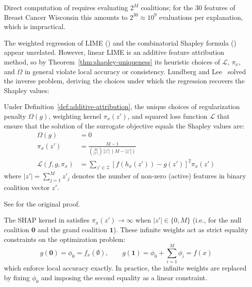     Direct computation of  requires evaluating $2^M$ coalitions; for the 30 features of Breast Cancer Wisconsin this amounts to $2^{30} \approx 10^9$ evaluations per explanation, which is impractical.

    The weighted regression of LIME () and the combinatorial Shapley formula () appear unrelated. However, linear LIME is an additive feature attribution method, so by Theorem~\ref{thm:shapley-uniqueness} its heuristic choices of $\mathcal{L}$, $\pi_x$, and $\Omega$ in general violate local accuracy or consistency. Lundberg and Lee~\cite{NIPS2017_8a20a862} solved the inverse problem, deriving the choices under which the regression recovers the Shapley values:

    \begin{theorem}
    \label{thm:shapley-kernel}
    Under Definition~\ref{def:additive-attribution}, the unique choices of regularization penalty $\Omega(g)$, weighting kernel $\pi_x(z')$, and squared loss function $\mathcal{L}$ that ensure that the solution of the surrogate objective equals the Shapley values are:
    \begin{align}
        \Omega(g) &= 0 \label{eq:kernelshap-reg} \\
        \pi_x(z') &= \frac{M - 1}{\binom{M}{|z'|} \, |z'| \, (M - |z'|)} \label{eq:shap-kernel} \\
        \mathcal{L}(f, g, \pi_x) &= \sum_{z' \in \mathcal{Z}} \left[ f(h_x(z')) - g(z') \right]^2 \pi_x(z') \label{eq:kernelshap-loss}
    \end{align}
    where $|z'| = \sum_{j=1}^M z'_j$ denotes the number of non-zero (active) features in binary coalition vector $z'$.
    \end{theorem}

    See  for the original proof.

    The SHAP kernel in  satisfies $\pi_x(z') \to \infty$ when $|z'| \in \{0, M\}$ (i.e., for the null coalition $\mathbf{0}$ and the grand coalition $\mathbf{1}$). These infinite weights act as strict equality constraints on the optimization problem:
    \begin{equation}
        g(\mathbf{0}) = \phi_0 = f_x(\emptyset), \qquad g(\mathbf{1}) = \phi_0 + \sum_{i=1}^M \phi_i = f(x)
    \end{equation}
    which enforce local accuracy exactly. In practice, the infinite weights are replaced by fixing $\phi_0$ and imposing the second equality as a linear constraint.

